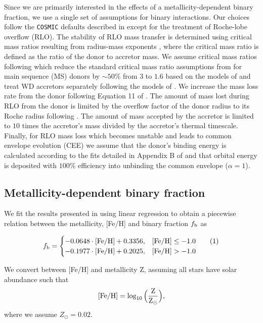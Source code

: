 \documentclass[twocolumn, linenumbers]{aastex631}
\newcommand\numberthis{\addtocounter{equation}{1}\tag{\theequation}}
\begin{document}
Since we are primarily interested in the effects of a metallicity-dependent binary fraction, we use a single set of assumptions for binary interactions. Our choices follow the \texttt{COSMIC} defaults described in \citet{Breivik2020a} except for the treatment of Roche-lobe overflow (RLO). The stability of RLO mass transfer is determined using critical mass ratios resulting from radius-mass exponents \citep{Webbink1985, Hurley2002}, where the critical mass ratio is defined as the ratio of the donor to accretor mass. We assume critical mass ratios following \citet{Claeys2014} which reduce the standard critical mass ratio assumptions from \citet{Hurley2002} for main sequence (MS) donors by $\sim50\%$ from $3$ to $1.6$ based on the models of \citet{deMink2007} and treat WD accretors separately following the models of \citet{Soberman1997}. We increase the mass loss rate from the donor following Equation 11 of \citet{Claeys2014}. The amount of mass lost during RLO from the donor is limited by the overflow factor of the donor radius to its Roche radius following \citet{Hurley2002}. The amount of mass accepted by the accretor is limited to $10$ times the accretor's mass divided by the accretor's thermal timescale. Finally, for RLO mass loss which becomes unstable and leads to common envelope evolution (CEE) we assume that the donor's binding energy is calculated according to the fits detailed in Appendix B of \citet{Claeys2014} and that orbital energy is deposited with $100\%$ efficiency into unbinding the common envelope ($\alpha=1$).

\subsection{Metallicity-dependent binary fraction}
We fit the results presented in \citet{Moe2019} using linear regression to obtain a piecewise relation between the metallicity, [Fe/H] and binary fraction $f_{\rm{b}}$ as

\[f_{\rm{b}}= \begin{cases} 
      - 0.0648 \cdot [\rm{Fe/H}] + 0.3356, & [\rm{Fe/H}]\leq -1.0 \numberthis \\
      -0.1977 \cdot [\rm{Fe/H}] + 0.2025, & [\rm{Fe/H}]> -1.0  
   \end{cases}
\]


\noindent We convert between [Fe/H] and metallicity Z, assuming all stars have solar abundance such that
\begin{equation}
\label{eq:metallicity}
    [\rm{Fe/H}] = \log_{10}\Big(\frac{Z}{Z_{\odot}}\Big),
\end{equation}
\noindent where we assume $Z_{\odot}=0.02$.
\end{document}
